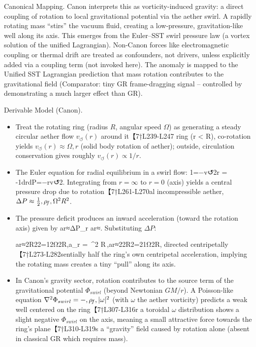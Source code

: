 \documentclass[11pt]{article}
\begin{document}
Canonical Mapping. Canon interprets this as vorticity-induced gravity: a direct coupling of rotation to local gravitational potential via the aether swirl. A rapidly rotating mass “stirs” the vacuum fluid, creating a low-pressure, gravitation-like well along its axis. This emerges from the Euler–SST swirl pressure law (a vortex solution of the unified Lagrangian). Non-Canon forces like electromagnetic coupling or thermal drift are treated as confounders, not drivers, unless explicitly added via a coupling term (not invoked here). The anomaly is mapped to the Unified SST Lagrangian prediction that mass rotation contributes to the gravitational field (Comparator: tiny GR frame-dragging signal – controlled by demonstrating a much larger effect than GR).


Derivable Model (Canon).


\begin{itemize}

\item 
Treat the rotating ring (radius $R$, angular speed $\Omega$) as generating a steady circular aether flow $v_{\circlearrowleft}(r)$ around it【7†L239-L247 ring (r < R), co-rotation yields $v_{\circlearrowleft}(r)\approx \Omega,r$ (solid body rotation of aether); outside, circulation conservation gives roughly $v_{\circlearrowleft}(r)\propto 1/r$.




\item 
The Euler equation for radial equilibrium in a swirl flow: 1\rhoFdPdr=−v↺2r = -\rhoF1drdP=−rv↺2. Integrating from $r=\infty$ to $r=0$ (axis) yields a central pressure drop due to rotation【7†L261-L270al incompressible aether, $\Delta P \approx \tfrac{1}{2},\rho_{\!f},\Omega^2 R^2$.




\item 
The pressure deficit produces an inward acceleration (toward the rotation axis) given by ar≈ΔP\rhoFRa_{r} \approx {}ar≈. Substituting $\Delta P$:


ar≈2R22\rhoFR=12Ω2R,a_{r} \;\approx\;  \;=\; \,\Omega^2 R\,,ar≈2\rhoFR{}2R2=21Ω2R,
directed centripetally【7†L273-L282sentially half the ring’s own centripetal acceleration, implying the rotating mass creates a tiny “pull” along its axis.




\item 
In Canon’s gravity sector, rotation contributes to the source term of the gravitational potential $\Phi_{swirl}$ (beyond Newtonian $GM/r$). A Poisson-like equation $\nabla^2 \Phi_{swirl} = -,\rho_{\!f},|\omega|^2$ (with $\omega$ the aether vorticity) predicts a weak well centered on the ring【7†L307-L316r a toroidal $\omega$ distribution shows a slight negative $\Phi_{swirl}$ on the axis, meaning a small attractive force towards the ring’s plane【7†L310-L319s a “gravity” field caused by rotation alone (absent in classical GR which requires mass).




\end{itemize}
\end{document}
